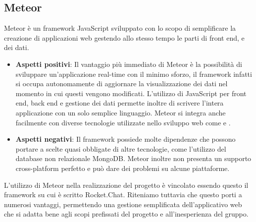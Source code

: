 \subsection{Meteor}
Meteor è un framework JavaScript sviluppato con lo scopo di semplificare la creazione di applicazioni web gestendo allo stesso tempo le parti di front end,  e dei dati.
\begin{itemize}
	\item \textbf{Aspetti positivi}: Il vantaggio più immediato di Meteor è la possibilità di sviluppare un'applicazione real-time con il minimo sforzo, il framework infatti si occupa autonomamente di aggiornare la visualizzazione dei dati nel momento in cui questi vengono modificati. L'utilizzo di JavaScript per front end, back end e gestione dei dati permette inoltre di scrivere l'intera applicazione con un solo semplice linguaggio. Meteor si integra anche facilmente con diverse tecnologie utilizzate nello sviluppo web come  e .  
	\item \textbf{Aspetti negativi}: Il framework possiede molte dipendenze che possono portare a scelte quasi obbligate di altre tecnologie, come l'utilizzo del database non relazionale MongoDB. Meteor inoltre non presenta un supporto cross-platform perfetto e può dare dei problemi su alcune piattaforme.
\end{itemize}
L'utilizzo di Meteor nella realizzazione del progetto è vincolato essendo questo il framework su cui è scritto Rocket.Chat. Riteniamo tuttavia che questo porti a numerosi vantaggi, permettendo una gestione semplificata dell'applicativo web che si adatta bene agli scopi prefissati del progetto e all'inesperienza del gruppo.

